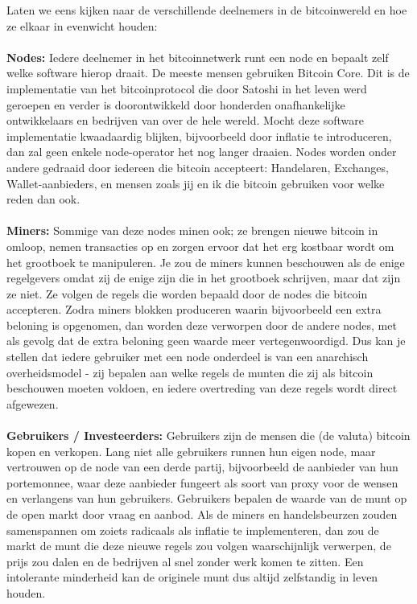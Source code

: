 \documentclass[smalldemyvopaper,11pt,twoside,onecolumn,openright,extrafontsizes]{memoir}
\begin{document}
Laten we eens kijken naar de verschillende deelnemers in de bitcoinwereld en hoe ze elkaar in evenwicht houden:

\paragraph{}
\noindent\textbf{Nodes:} 
Iedere deelnemer in het bitcoinnetwerk runt een node en bepaalt zelf welke software hierop draait. De meeste mensen gebruiken Bitcoin Core. Dit is de implementatie van het bitcoinprotocol die door Satoshi in het leven werd geroepen en verder is doorontwikkeld door honderden onafhankelijke ontwikkelaars en bedrijven van over de hele wereld. Mocht deze software implementatie kwaadaardig blijken, bijvoorbeeld door inflatie te introduceren, dan zal geen enkele node-operator het nog langer draaien. Nodes worden onder andere gedraaid door iedereen die bitcoin accepteert: Handelaren, Exchanges, Wallet-aanbieders, en mensen zoals jij en ik die bitcoin gebruiken voor welke reden dan ook. 

\paragraph{}
\noindent\textbf{Miners:} 
Sommige van deze nodes minen ook; ze brengen nieuwe bitcoin in omloop, nemen transacties op en zorgen ervoor dat het erg kostbaar wordt om het grootboek te manipuleren. Je zou de miners kunnen beschouwen als de enige regelgevers omdat zij de enige zijn die in het grootboek schrijven, maar dat zijn ze niet. Ze volgen de regels die worden bepaald door de nodes die bitcoin accepteren. Zodra miners blokken produceren waarin bijvoorbeeld een extra beloning is opgenomen, dan worden deze verworpen door de andere nodes, met als gevolg dat de extra beloning geen waarde meer vertegenwoordigd. Dus kan je stellen dat iedere gebruiker met een node onderdeel is van een anarchisch overheidsmodel - zij bepalen aan welke regels de munten die zij als bitcoin beschouwen moeten voldoen, en iedere overtreding van deze regels wordt direct afgewezen.

\paragraph{}
\noindent\textbf{Gebruikers / Investeerders:} 
Gebruikers zijn de mensen die (de valuta) bitcoin kopen en verkopen. Lang niet alle gebruikers runnen hun eigen node, maar vertrouwen op de node van een derde partij, bijvoorbeeld de aanbieder van hun portemonnee, waar deze aanbieder fungeert als soort van proxy voor de wensen en verlangens van hun gebruikers. Gebruikers bepalen de waarde van de munt op de open markt door vraag en aanbod. Als de miners en handelsbeurzen zouden samenspannen om zoiets radicaals als inflatie te implementeren, dan zou de markt de munt die deze nieuwe regels zou volgen waarschijnlijk verwerpen, de prijs zou dalen en de bedrijven al snel zonder werk komen te zitten. Een intolerante minderheid kan de originele munt dus altijd zelfstandig in leven houden.
\end{document}
